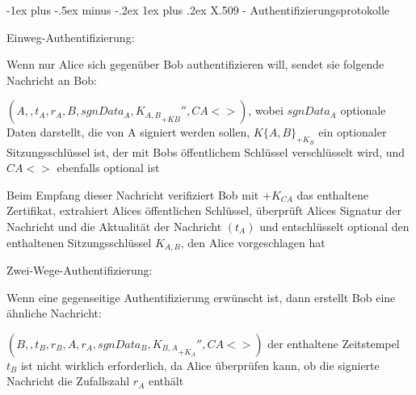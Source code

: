 \documentclass[a4paper]{article}
\makeatletter
\renewcommand{\subsubsection}{\@startsection{subsubsection}{3}{0mm}%
 {-1ex plus -.5ex minus -.2ex}%
 {1ex plus .2ex}%
 {\normalfont\small\bfseries}}
\makeatother
\begin{document}
\begin{multicols}{3}
      \subsubsection{X.509 -
            Authentifizierungsprotokolle}

      \begin{itemize*}
            \item Einweg-Authentifizierung:
            \begin{itemize*}
                  \item Wenn nur Alice sich gegenüber Bob authentifizieren will, sendet sie folgende Nachricht an Bob:
            \end{itemize*}
            \begin{enumerate*}
                  \def\labelenumi{\arabic{enumi}.}
                  \item $(A,,t_A, r_A, B, sgnData_A, {K_{A,B}}_{+KB}'', CA<>)$, wobei $sgnData_A$ optionale Daten darstellt, die von A signiert werden sollen, $K\{A,B\}_{+K_B}$ ein optionaler Sitzungsschlüssel ist, der mit Bobs öffentlichem Schlüssel verschlüsselt wird, und $CA<>$ ebenfalls optional ist
            \end{enumerate*}
            \begin{itemize*}
                  \item Beim Empfang dieser Nachricht verifiziert Bob mit $+K_{CA}$ das enthaltene Zertifikat, extrahiert Alices öffentlichen Schlüssel, überprüft Alices Signatur der Nachricht und die Aktualität der Nachricht $(t_A)$ und entschlüsselt optional den enthaltenen Sitzungsschlüssel $K_{A,B}$, den Alice vorgeschlagen hat
            \end{itemize*}
            \item Zwei-Wege-Authentifizierung:
            \begin{itemize*}
                  \item Wenn eine gegenseitige Authentifizierung erwünscht ist, dann erstellt Bob eine ähnliche Nachricht:
            \end{itemize*}
            \begin{enumerate*}
                  \def\labelenumi{\arabic{enumi}.}
                  \setcounter{enumi}{1}
                  \item $(B,,t_B, r_B, A, r_A, sgnData_B,{K_{B,A}}_{+K_A}'', CA<>)$ der enthaltene Zeitstempel $t_B$ ist nicht wirklich erforderlich, da Alice überprüfen kann, ob die signierte Nachricht die Zufallszahl $r_A$ enthält
            \end{enumerate*}

\end{itemize*}
\end{multicols}
\end{document}
